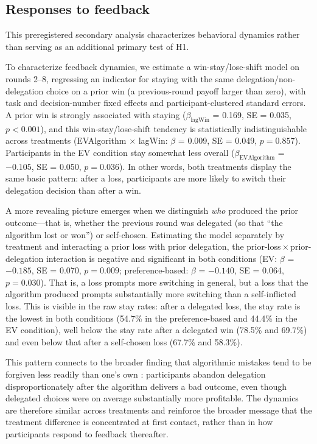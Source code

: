 \documentclass[a4paper, 12pt, fleqn]{article}
\theoremstyle{definition}
\begin{document}
\subsection{Responses to feedback}
This preregistered secondary analysis characterizes behavioral dynamics rather than serving as an additional primary test of H1.

To characterize feedback dynamics, we estimate a win-stay/lose-shift model on rounds 2--8, regressing an indicator for staying with the same delegation/non-delegation choice on a prior win (a previous-round payoff larger than zero), with task and decision-number fixed effects and participant-clustered standard errors. A prior win is strongly associated with staying ($\beta_{\text{lagWin}}$ = 0.169, SE = 0.035, $p < 0.001$), and this win-stay/lose-shift tendency is statistically indistinguishable across treatments (EVAlgorithm $\times$ lagWin: $\beta$ = 0.009, SE = 0.049, $p = 0.857$). Participants in the EV condition stay somewhat less overall ($\beta_{\text{EVAlgorithm}}$ = $-0.105$, SE = 0.050, $p = 0.036$). In other words, both treatments display the same basic pattern: after a loss, participants are more likely to switch their delegation decision than after a win.

A more revealing picture emerges when we distinguish \emph{who} produced the prior outcome---that is, whether the previous round was delegated (so that ``the algorithm lost or won'') or self-chosen. Estimating the model separately by treatment and interacting a prior loss with prior delegation, the prior-loss\,$\times$\,prior-delegation interaction is negative and significant in both conditions (EV: $\beta$ = $-0.185$, SE = 0.070, $p = 0.009$; preference-based: $\beta$ = $-0.140$, SE = 0.064, $p = 0.030$). That is, a loss prompts more switching in general, but a loss that the algorithm produced prompts substantially more switching than a self-inflicted loss. This is visible in the raw stay rates: after a delegated loss, the stay rate is the lowest in both conditions (54.7\% in the preference-based and 44.4\% in the EV condition), well below the stay rate after a delegated win (78.5\% and 69.7\%) and even below that after a self-chosen loss (67.7\% and 58.3\%). 

This pattern connects to the broader finding that algorithmic mistakes tend to be forgiven less readily than one's own \citep{Dietvorst2018,Renier2021}: participants abandon delegation disproportionately after the algorithm delivers a bad outcome, even though delegated choices were on average substantially more profitable. The dynamics are therefore similar across treatments and reinforce the broader message that the treatment difference is concentrated at first contact, rather than in how participants respond to feedback thereafter.
\end{document}
